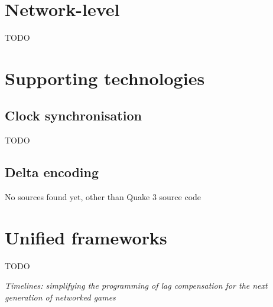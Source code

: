 \documentclass[conference]{IEEEtran}
\begin{document}
	\section{Network-level}

	TODO \cite{yu2008latency} \cite{yu2012latency}

	\section{Supporting technologies}

	\subsection{Clock synchronisation}

	TODO \cite{cristian1989probabilistic}

	\subsection{Delta encoding}

	No sources found yet, other than Quake 3 source code

	\section{Unified frameworks}

	TODO \cite{savery2013timelines} \cite{diot1999distributed}

	\emph{Timelines: simplifying the programming of lag compensation for the next generation of networked games}
\end{document}
